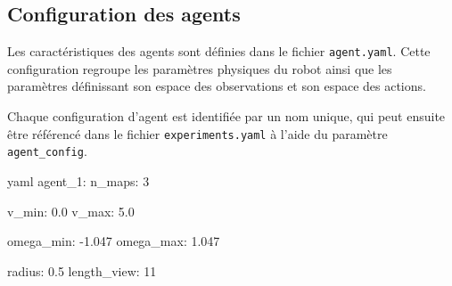 \subsection{Configuration des agents}

\noindent Les caractéristiques des agents sont définies dans le fichier \texttt{agent.yaml}. Cette configuration regroupe les paramètres physiques du robot ainsi que les paramètres définissant son espace des observations et son espace des actions.

\vspace{10pt}

\noindent Chaque configuration d'agent est identifiée par un nom unique, qui peut ensuite être référencé dans le fichier \texttt{experiments.yaml} à l'aide du paramètre \texttt{agent\_config}.

\begin{codebox}{yaml}
agent_1:
  n_maps: 3

  v_min: 0.0
  v_max: 5.0

  omega_min: -1.047
  omega_max: 1.047

  radius: 0.5
  length_view: 11
\end{codebox}

